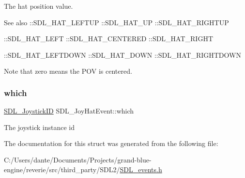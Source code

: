 The hat position value. \begin{DoxySeeAlso}{See also}
\+::\+S\+D\+L\+\_\+\+H\+A\+T\+\_\+\+L\+E\+F\+T\+UP \+::\+S\+D\+L\+\_\+\+H\+A\+T\+\_\+\+UP \+::\+S\+D\+L\+\_\+\+H\+A\+T\+\_\+\+R\+I\+G\+H\+T\+UP 

\+::\+S\+D\+L\+\_\+\+H\+A\+T\+\_\+\+L\+E\+FT \+::\+S\+D\+L\+\_\+\+H\+A\+T\+\_\+\+C\+E\+N\+T\+E\+R\+ED \+::\+S\+D\+L\+\_\+\+H\+A\+T\+\_\+\+R\+I\+G\+HT 

\+::\+S\+D\+L\+\_\+\+H\+A\+T\+\_\+\+L\+E\+F\+T\+D\+O\+WN \+::\+S\+D\+L\+\_\+\+H\+A\+T\+\_\+\+D\+O\+WN \+::\+S\+D\+L\+\_\+\+H\+A\+T\+\_\+\+R\+I\+G\+H\+T\+D\+O\+WN
\end{DoxySeeAlso}
Note that zero means the P\+OV is centered. \mbox{\label{struct_s_d_l___joy_hat_event_ac9d9bb179f9116d16b3da47cacd74b55}} 
\subsubsection{\texorpdfstring{which}{which}}
{\footnotesize\ttfamily \mbox{\hyperlink{_s_d_l__joystick_8h_a3c3d32500cb08f76ee8077983912c0bd}{S\+D\+L\+\_\+\+Joystick\+ID}} S\+D\+L\+\_\+\+Joy\+Hat\+Event\+::which}

The joystick instance id 

The documentation for this struct was generated from the following file\+:\begin{DoxyCompactItemize}
\item 
C\+:/\+Users/dante/\+Documents/\+Projects/grand-\/blue-\/engine/reverie/src/third\+\_\+party/\+S\+D\+L2/\mbox{\hyperlink{_s_d_l__events_8h}{S\+D\+L\+\_\+events.\+h}}\end{DoxyCompactItemize}
